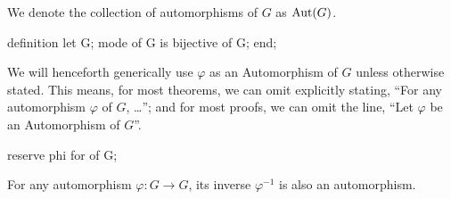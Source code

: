 \begin{remark}
We denote the collection of automorphisms of $G$ as $\operatorname{Aut}(G)$.
\end{remark}

\nwenddocs{}\endmoddef\nwstartdeflinemarkup{}\nwenddeflinemarkup
definition
  let G;
  mode  of G is bijective  of G;
end;
\eatline
{}\nwendcode{}\nwdocspar
\begin{reserve}
  We will henceforth generically use $\varphi$ as an Automorphism of $G$
  unless otherwise stated. This means, for most theorems, we can omit
  explicitly stating, ``For any automorphism $\varphi$ of $G$, \dots'';
  and for most proofs, we can omit the line, ``Let $\varphi$ be an
  Automorphism of $G$''.
\end{reserve}

\nwenddocs{}\endmoddef\nwstartdeflinemarkup{}\nwenddeflinemarkup
reserve phi for  of G;
\nwendcode{}\nwdocspar

\begin{proposition}
For any automorphism $\varphi\colon G\to G$, its inverse $\varphi^{-1}$
is also an automorphism.
\end{proposition}

